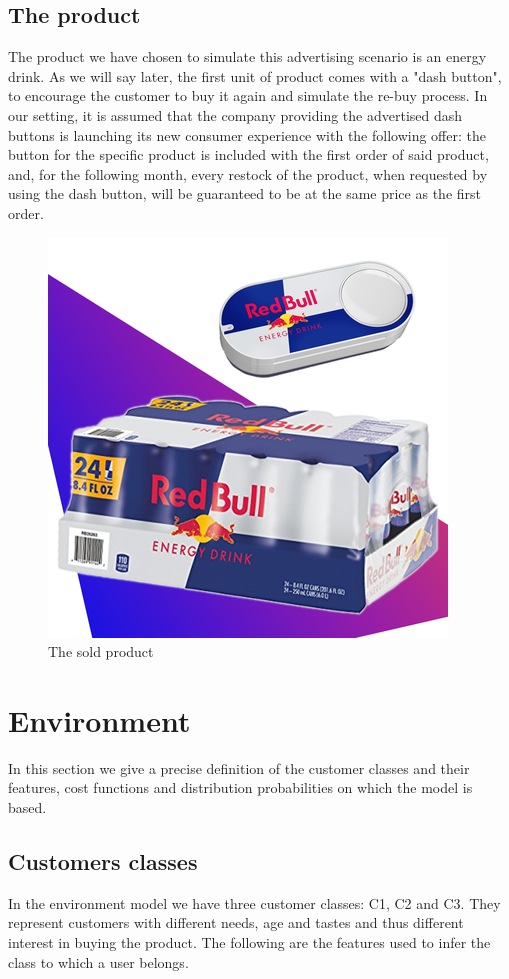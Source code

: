 \documentclass[12pt,a4paper]{report}
\begin{document}
\section{The product}
The product we have chosen to simulate this advertising scenario is an energy drink. As we will say later, the first unit of product comes with a "dash button", to encourage the customer to buy it again and simulate the re-buy process.
In our setting, it is assumed that the company providing the advertised dash buttons is launching its new consumer experience with the following offer: the button for the specific product is included with the first order of said product, and, for the following month, every restock of the product, when requested by using the dash button, will be guaranteed to be at the same price as the first order.
\begin{figure}[H]
\centering
  \includegraphics[scale = 0.7, center]{redbull-dash}
  \caption{The sold product}
\end{figure}

	\chapter{Environment}	
		\label{chap:env}	
In this section we give a precise definition of the customer classes and their features, cost functions and distribution probabilities on which the model is based.

		\section{Customers classes}
In the environment model we have three customer classes: C1, C2 and C3.
They represent customers with different needs, age and tastes and thus different interest in buying the product. The following are the features used to infer the class to which a user belongs.
\end{document}
